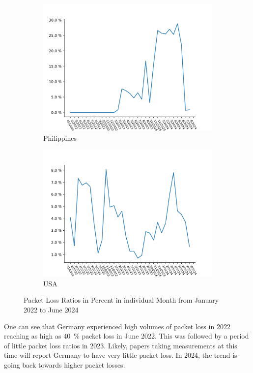 \begin{figure}
\begin{subfigure}[t]{0.47\linewidth}
		\includegraphics[width=\linewidth]{./chapters/4-results/packet-loss/img/PH.pdf}
		\caption{Philippines}
	\end{subfigure}
	\begin{subfigure}[t]{0.47\linewidth}
		\includegraphics[width=\linewidth]{./chapters/4-results/packet-loss/img/US.pdf}
		\caption{USA}
	\end{subfigure}
	\caption{Packet Loss Ratios in Percent in individual Month from January
		2022 to June 2024}
	\label{fig:packet-loss-fine-grained}
\end{figure}

One can see that Germany experienced high volumes of packet loss in 2022
reaching as high as 40~\% packet loss in June 2022. This was followed by a
period of little packet loss ratios in 2023. Likely, papers taking measurements
at this time will report Germany to have very little packet loss. In 2024, the
trend is going back towards higher packet losses.


